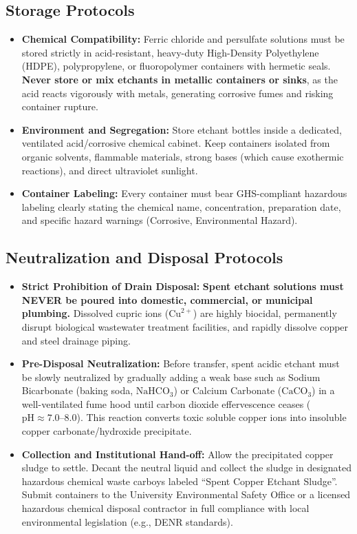 \subsection{Storage Protocols}
\begin{itemize}[leftmargin=1.5em]
    \item \textbf{Chemical Compatibility:} Ferric chloride and persulfate solutions must be stored strictly in acid-resistant, heavy-duty High-Density Polyethylene (HDPE), polypropylene, or fluoropolymer containers with hermetic seals. \textbf{Never store or mix etchants in metallic containers or sinks}, as the acid reacts vigorously with metals, generating corrosive fumes and risking container rupture.
    \item \textbf{Environment and Segregation:} Store etchant bottles inside a dedicated, ventilated acid/corrosive chemical cabinet. Keep containers isolated from organic solvents, flammable materials, strong bases (which cause exothermic reactions), and direct ultraviolet sunlight.
    \item \textbf{Container Labeling:} Every container must bear GHS-compliant hazardous labeling clearly stating the chemical name, concentration, preparation date, and specific hazard warnings (Corrosive, Environmental Hazard).
\end{itemize}

\subsection{Neutralization and Disposal Protocols}
\begin{itemize}[leftmargin=1.5em]
    \item \textbf{Strict Prohibition of Drain Disposal:} \textbf{Spent etchant solutions must NEVER be poured into domestic, commercial, or municipal plumbing.} Dissolved cupric ions ($\text{Cu}^{2+}$) are highly biocidal, permanently disrupt biological wastewater treatment facilities, and rapidly dissolve copper and steel drainage piping.
    \item \textbf{Pre-Disposal Neutralization:} Before transfer, spent acidic etchant must be slowly neutralized by gradually adding a weak base such as Sodium Bicarbonate (baking soda, $\text{NaHCO}_3$) or Calcium Carbonate ($\text{CaCO}_3$) in a well-ventilated fume hood until carbon dioxide effervescence ceases ($\text{pH} \approx 7.0\text{--}8.0$). This reaction converts toxic soluble copper ions into insoluble copper carbonate/hydroxide precipitate.
    \item \textbf{Collection and Institutional Hand-off:} Allow the precipitated copper sludge to settle. Decant the neutral liquid and collect the sludge in designated hazardous chemical waste carboys labeled ``Spent Copper Etchant Sludge''. Submit containers to the University Environmental Safety Office or a licensed hazardous chemical disposal contractor in full compliance with local environmental legislation (e.g., DENR standards).
\end{itemize}
